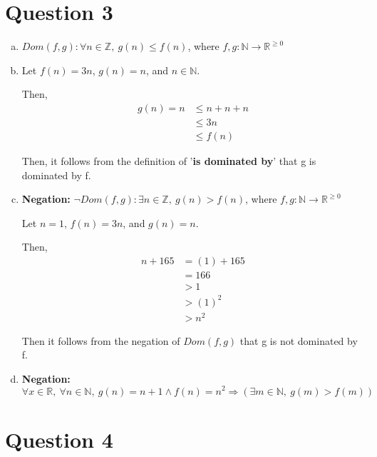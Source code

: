 \documentclass[12pt]{article}
\begin{document}
\section*{Question 3}
\begin{enumerate}[a.]
    \item

    $Dom(f,g): \forall n \in \mathbb{Z},\: g(n) \leq f(n)$, where $f,g: \mathbb{N}
    \to \mathbb{R}^{\geq 0}$

    \item

    Let $f(n) = 3n$, $g(n) = n$, and $n \in \mathbb{N}$.

    \bigskip

    Then,
    \setcounter{equation}{0}
    \begin{align}
        g(n) = n &\leq n + n + n\\
        &\leq 3n\\
        &\leq f(n)
    \end{align}

    Then, it follows from the definition of '\textbf{is dominated by}' that g is
    dominated by f.

    \item

    \textbf{Negation:} $\neg Dom(f,g): \exists n \in \mathbb{Z},\:g(n) > f(n)$, where
    $f,g: \mathbb{N} \to \mathbb{R}^{\geq 0}$

    \bigskip

    Let $n = 1$, $f(n) = 3n$, and $g(n) = n$.

    \bigskip

    Then,
    \setcounter{equation}{0}
    \begin{align}
        n + 165 &= (1) + 165\\
        &= 166\\
        &> 1\\
        &> (1)^2\\
        &> n^2
    \end{align}

    \bigskip

    Then it follows from the negation of $Dom(f,g)$ that g is not dominated by f.

    \item

    \textbf{Negation:} $\forall x \in \mathbb{R},\:\forall n \in \mathbb{N},\:
    g(n) = n + 1 \land f(n) = n^2 \Rightarrow (\exists m \in \mathbb{N},\:
    g(m) > f(m))$

\end{enumerate}

\section*{Question 4}
\end{document}
